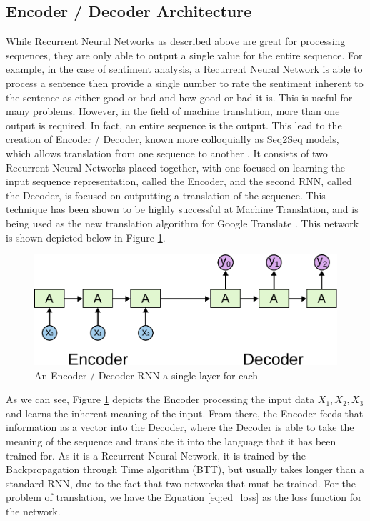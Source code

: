 \documentclass[pageno]{jpaper}
\begin{document}
\subsection{Encoder / Decoder Architecture}
While Recurrent Neural Networks as described above are great for processing sequences, they are only able to output a single value for the entire sequence.  For example, in the case of sentiment analysis, a Recurrent Neural Network is able to process a sentence then provide a single number to rate the sentiment inherent to the sentence as either good or bad and how good or bad it is.  This is useful for many problems.  However, in the field of machine translation, more than one output is required.  In fact, an entire sequence is the output.  This lead to the creation of Encoder / Decoder, known more colloquially as Seq2Seq models, which allows translation from one sequence to another \cite{cho:2014}.  It consists of two Recurrent Neural Networks placed together, with one focused on learning the input sequence representation, called the Encoder, and the second RNN, called the Decoder, is focused on outputting a translation of the sequence.  This technique has been shown to be highly successful at Machine Translation, and is being used as the new translation algorithm for Google Translate \cite{wu:2016}.  This network is shown depicted below in Figure \ref{fg:enc_dec}.
\begin{figure}[H]
	\centering
	\includegraphics[scale=1.0]{encoder_decoder.pdf}
	\vspace{1pc}
	\caption{An Encoder / Decoder RNN a single layer for each \cite{olah:2015}}
	\label{fg:enc_dec}
\end{figure}

As we can see, Figure \ref{fg:enc_dec} depicts the Encoder processing the input data $X_{1}, X_{2}, X_{3}$ and learns the inherent meaning of the input.  From there, the Encoder feeds that information as a vector into the Decoder, where the Decoder is able to take the meaning of the sequence and translate it into the language that it has been trained for.  As it is a Recurrent Neural Network, it is trained by the Backpropagation through Time algorithm (BTT), but usually takes longer than a standard RNN, due to the fact that two networks that must be trained.  For the problem of translation, we have the Equation \ref{eq:ed_loss} as the loss function for the network.
\end{document}
